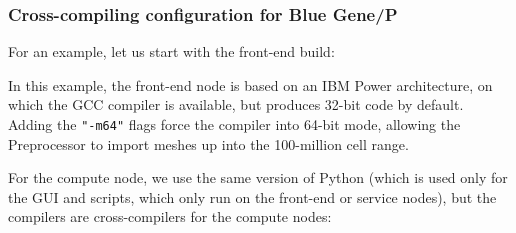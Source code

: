 \documentclass[a4paper,10pt,twoside]{csshortdoc}
\begin{document}
\subsubsection{Cross-compiling configuration for Blue Gene/P}

For an example, let us start with the front-end build:


In this example, the front-end node is based on an IBM Power architecture,
on which the GCC compiler is available, but produces 32-bit code by default.
Adding the \texttt{"-m64"} flags force the compiler into 64-bit mode, allowing
the Preprocessor to import meshes up into the 100-million cell range.

For the compute node, we use the same version of Python (which
is used only for the GUI and scripts, which only run on the front-end
or service nodes), but the compilers are cross-compilers for the
compute nodes:
\end{document}
